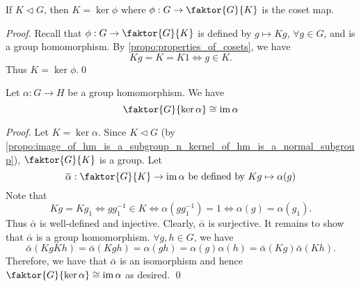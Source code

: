 \begin{propo}
\label{propo:normal_subgroup_as_the_kernel}
  If $K \triangleleft G$, then $K = \ker \phi$ where $\phi : G \to \faktor{G}{K}$ is the coset map.
\end{propo}

\begin{proof}
  Recall that $\phi : G \to \faktor{G}{K}$ is defined by $g \mapsto Kg$, $\forall g \in G$, and is a group homomorphism. By \cref{propo:properties_of_cosets}, we have
  \begin{equation*}
    Kg = K = K1 \iff g \in K.
  \end{equation*}
  Thus $K = \ker \phi$.\qed
\end{proof}

\begin{thm}
\label{thm:first_isomorphism_theorem}
  Let $\alpha: G \to H$ be a group homomorphism. We have
  \begin{equation*}
    \faktor{G}{\ker \alpha} \cong \img \alpha
  \end{equation*}
\end{thm}

\begin{proof}
  Let $K = \ker \alpha$. Since $K \triangleleft G$ (by \cref{propo:image_of_hm_is_a_subgroup_n_kernel_of_hm_is_a_normal_subgroup}), $\faktor{G}{K}$ is a group. Let
  \begin{equation*}
    \bar{\alpha} : \faktor{G}{K} \to \img \alpha \text{ be defined by } Kg \mapsto \alpha(g)
  \end{equation*}
  Note that
  \begin{equation*}
    Kg = Kg_1 \iff gg_1^{-1} \in K \iff \alpha(gg_1^{-1}) = 1 \iff \alpha(g) = \alpha(g_1).
  \end{equation*}
  Thus $\bar{ \alpha }$ is well-defined and injective. Clearly, $\bar{ \alpha }$ is surjective. It remains to show that $\bar{\alpha}$ is a group homomorphism. $\forall g, h \in G$, we have
  \begin{equation*}
    \bar{\alpha}(Kg Kh) = \bar{\alpha}(Kgh) = \alpha(gh) = \alpha(g) \alpha(h) = \bar{\alpha}(Kg) \bar{\alpha}(Kh).
  \end{equation*}
  Therefore, we have that $\bar{\alpha}$ is an isomorphism and hence $\faktor{G}{\ker \alpha} \cong \img \alpha$ as desired. \qed
\end{proof}



